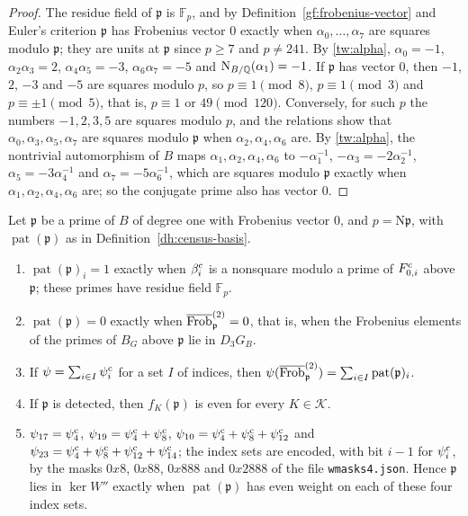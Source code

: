 \begin{proof}
The residue field of $\mathfrak p$ is $\mathbb F_p$, and by
Definition~\ref{gf:frobenius-vector} and Euler's criterion $\mathfrak p$ has
Frobenius vector $0$ exactly when $\alpha_0,\dots,\alpha_7$ are squares
modulo $\mathfrak p$; they are units at $\mathfrak p$ since $p\ge7$ and
$p\ne241$. By \eqref{tw:alpha}, $\alpha_0=-1$, $\alpha_2\alpha_3=2$,
$\alpha_4\alpha_5=-3$, $\alpha_6\alpha_7=-5$ and
$\mathrm N_{B/\mathbb Q}(\alpha_1)=-1$. If $\mathfrak p$ has vector $0$, then $-1$, $2$,
$-3$ and $-5$ are squares modulo $p$, so $p\equiv1\pmod8$, $p\equiv1\pmod3$
and $p\equiv\pm1\pmod5$, that is, $p\equiv1$ or $49\pmod{120}$. Conversely,
for such $p$ the numbers $-1,2,3,5$ are squares modulo $p$, and the
relations show that $\alpha_0,\alpha_3,\alpha_5,\alpha_7$ are squares modulo
$\mathfrak p$ when $\alpha_2,\alpha_4,\alpha_6$ are. By \eqref{tw:alpha},
the nontrivial automorphism of $B$ maps $\alpha_1,\alpha_2,\alpha_4,\alpha_6$ to
$-\alpha_1^{-1}$, $-\alpha_3=-2\alpha_2^{-1}$, $\alpha_5=-3\alpha_4^{-1}$ and
$\alpha_7=-5\alpha_6^{-1}$, which are squares modulo $\mathfrak p$ exactly
when $\alpha_1,\alpha_2,\alpha_4,\alpha_6$ are; so the conjugate prime also
has vector $0$.
\end{proof}

\begin{lemma}\label{dh:pattern-lemma}
Let $\mathfrak p$ be a prime of $B$ of degree one with Frobenius vector $0$,
and $p=\mathrm N\mathfrak p$, with $\operatorname{pat}(\mathfrak p)$ as in
Definition~\ref{dh:census-basis}.
\begin{enumerate}
\item[(a)] $\operatorname{pat}(\mathfrak p)_i=1$ exactly when $\beta^{\rm c}_i$ is a
 nonsquare modulo a prime of $F^{\rm c}_{0,i}$ above $\mathfrak p$; these primes have
 residue field $\mathbb F_p$.
\item[(b)] $\operatorname{pat}(\mathfrak p)=0$ exactly when
 $\overline{\operatorname{Frob}}^{(2)}_{\mathfrak p}=0$, that is, when the Frobenius
 elements of the primes of $B_G$ above $\mathfrak p$ lie in $D_3G_B$.
\item[(c)] If $\psi=\sum_{i\in I}\psi^{\rm c}_i$ for a set $I$ of indices,
 then $\psi(\overline{\operatorname{Frob}}^{(2)}_{\mathfrak p})=\sum_{i\in I}
 \operatorname{pat}(\mathfrak p)_i$.
\item[(d)] If $\mathfrak p$ is detected, then $f_K(\mathfrak p)$ is even for
 every $K\in\mathcal K$.
\item[(e)] $\psi_{17}=\psi^{\rm c}_4$,
 $\psi_{19}=\psi^{\rm c}_4+\psi^{\rm c}_8$,
 $\psi_{10}=\psi^{\rm c}_4+\psi^{\rm c}_8+\psi^{\rm c}_{12}$ and
 $\psi_{23}=\psi^{\rm c}_4+\psi^{\rm c}_8+\psi^{\rm c}_{12}+\psi^{\rm c}_{14}$;
 the index sets are encoded, with bit $i-1$ for $\psi^{\rm c}_i$, by the
 masks $0x8$, $0x88$, $0x888$ and $0x2888$ of the file
 \texttt{wmasks4.json}. Hence $\mathfrak p$ lies in $\ker W''$ exactly when
 $\operatorname{pat}(\mathfrak p)$ has even weight on each of these four
 index sets.
\end{enumerate}
\end{lemma}

